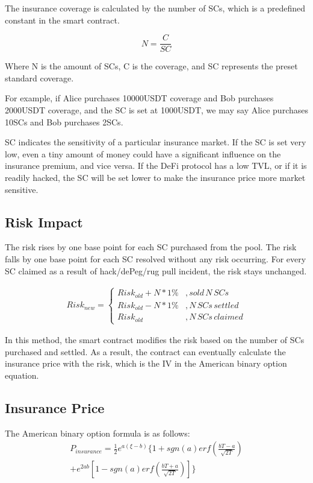 \documentclass[10pt, a4paper, twocolumn]{article} %
\begin{document}
The insurance coverage is calculated by the number of SCs, which is a predefined constant in the smart contract.

\begin{equation}
	N = \frac{C}{SC}\label{eq:equation}
\end{equation}

Where N is the amount of SCs, C is the coverage, and SC represents the preset standard coverage.

For example, if Alice purchases 10000USDT coverage and Bob purchases 2000USDT coverage, and the SC is set at 1000USDT, we may say Alice purchases 10SCs and Bob purchases 2SCs.

SC indicates the sensitivity of a particular insurance market.
If the SC is set very low, even a tiny amount of money could have a significant influence on the insurance premium, and vice versa.
If the DeFi protocol has a low TVL, or if it is readily hacked, the SC will be set lower to make the insurance price more market sensitive.

\subsection{Risk Impact}\label{subsec:risk-impact}

The risk rises by one base point for each SC purchased from the pool.
The risk falls by one base point for each SC resolved without any risk occurring.
For every SC claimed as a result of hack/dePeg/rug pull incident, the risk stays unchanged.

\begin{align} Risk_{new} = \left\{
\begin{aligned}
Risk_{old} + N * 1\%&, {sold\,N\,SCs}\\
Risk_{old} - N * 1\%&, {N\,SCs\,settled} \\
Risk_{old} &, {N\,SCs\,claimed}
\end{aligned}\right.
\end{align}

In this method, the smart contract modifies the risk based on the number of SCs purchased and settled.
As a result, the contract can eventually calculate the insurance price with the risk, which is the IV in the American binary option equation.

\subsection{Insurance Price}\label{subsec:insurance-price}
The American binary option formula is as follows:
\begin{equation}
	\begin{split}
	     P_{insurance} =
			\frac{1}{2}e^{a(\xi-b)}\{1+sgn(a){erf}\left(\frac{bT-a}{\sqrt {2T}}\right) \\
	+ e^{2ab}[1-sgn(a){erf}(\frac{bT+a}{\sqrt {2T}})] \}
	\end{split}\label{eq:American binary option}
\end{equation}
\end{document}
